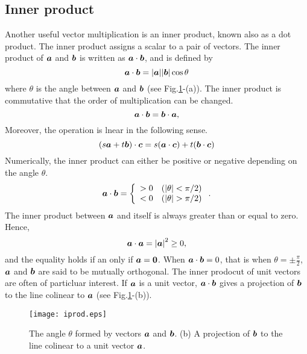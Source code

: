 \documentclass[10pt,a4j]{article}
\begin{document}
\subsection{Inner product} 
Another useful vector multiplication is an inner product, known also as a dot product. The inner product assigns a scalar to a pair of vectors. The inner product of $\mbox{\boldmath $a$}$ and $\mbox{\boldmath $b$}$ is written as $\mbox{\boldmath $a$}\cdot\mbox{\boldmath $b$}$, 
and is defined by 
\begin{equation}
    \mbox{\boldmath $a$}\cdot\mbox{\boldmath $b$}=|\mbox{\boldmath $a$}||\mbox{\boldmath $b$}|\cos\theta
    \label{eqn:idot_def}
\end{equation}
where $\theta$ is the angle between $\mbox{\boldmath $a$}$ and $\mbox{\boldmath $b$}$ (see Fig.\ref{fig:fig5}-(a)). The inner product is commutative that the order of multiplication can be changed.
\begin{equation}
    \mbox{\boldmath $a$}\cdot\mbox{\boldmath $b$}
    =
    \mbox{\boldmath $b$}\cdot\mbox{\boldmath $a$}, 
    \label{eqn:ab_ba}
\end{equation}
Moreover, the operation is lnear in the following sense.
\begin{equation}
    \left(s\mbox{\boldmath $a$}+t\mbox{\boldmath $b$}\right)\cdot\mbox{\boldmath $c$}
    =
    s(\mbox{\boldmath $a$}\cdot\mbox{\boldmath $c$})+t(\mbox{\boldmath $b$}\cdot \mbox{\boldmath $c$})
    \label{eqn:a_dot_b_lin}
\end{equation}
Numerically, the inner product can either be positive or negative depending on the angle $\theta$.
\begin{equation}
    \mbox{\boldmath $a$}\cdot\mbox{\boldmath $b$}
    =
    \left\{
    \begin{array}{cc}
        >0 & ( |\theta|< \pi/2) \\
        <0 & ( |\theta| > \pi/2)
    \end{array}
    \right.
    .
    \label{eqn:}
\end{equation}
The inner product between $\mbox{\boldmath $a$}$ and itself is always greater than or equal to zero. Hence, 
\begin{equation}
    \mbox{\boldmath $a$}\cdot \mbox{\boldmath $a$}=\left| \mbox{\boldmath $a$} \right|^2 \geq 0, 
    \label{eqn:a_dot_a}
\end{equation}
 and the equality holds if an only if $\mbox{\boldmath $a$}=\mbox{\boldmath $0$}$. When $\mbox{\boldmath $a$}\cdot\mbox{\boldmath $b$}=0$, 
 that is when $\theta=\pm\frac{\pi}{2}$, $\mbox{\boldmath $a$}$ and $\mbox{\boldmath $b$}$ are said to be mutually orthogonal. The inner prodocut of unit vectors are often of particluar interest. If $\mbox{\boldmath $a$}$ is a unit vector, $\mbox{\boldmath $a$}\cdot\mbox{\boldmath $b$}$ gives a projection 
of $\mbox{\boldmath $b$}$ to the line colinear to $\mbox{\boldmath $a$}$ (see Fig.\ref{fig:fig5}-(b)). 
\begin{figure}[h]
    \begin{center}
    \texttt{[image: iprod.eps]} 
    \end{center}
    \caption{The angle $\theta$ formed by vectors $\mbox{\boldmath $a$}$ and $\mbox{\boldmath $b$}$. 
    (b) A projection of $\mbox{\boldmath $b$}$ to the line colinear to a unit vector $\mbox{\boldmath $a$}$.} 
    \label{fig:fig5}
\end{figure}
%
\end{document}

